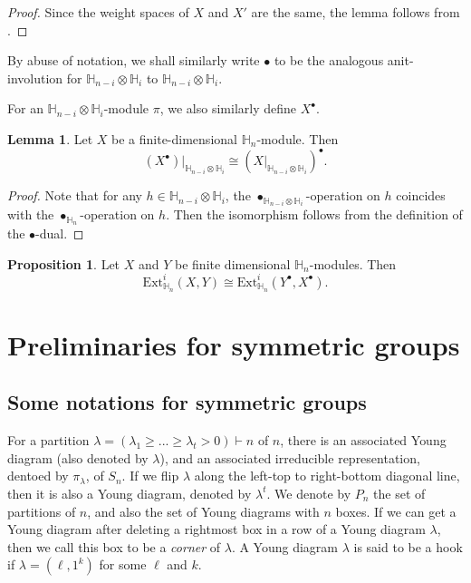 \documentclass[11pt]{amsart}
\numberwithin{equation}{section}
\theoremstyle{definition}
\newtheorem{lemma}[thm]{Lemma}
\newtheorem{proposition}[thm]{Proposition}
\begin{document}
\begin{proof}
Since the weight spaces of \(X\) and \(X'\) are the same, the lemma follows from \cite[Propsoiton 4.3.1]{barbasch2013hermitian}.
\end{proof}



By abuse of notation, we shall similarly write $\bullet$ to be the analogous anit-involution for $\mathbb H_{n-i}\otimes \mathbb H_i$ to $\mathbb H_{n-i}\otimes \mathbb H_i$. 

For an $\mathbb H_{n-i}\otimes \mathbb H_i$-module $\pi$, we also similarly define $X^{\bullet}$.

\begin{lemma} \label{lem dual of bullet}
Let $X$ be a finite-dimensional $\mathbb H_n$-module. Then 
\[   (X^{\bullet})|_{\mathbb H_{n-i}\otimes \mathbb H_i} \cong (X|_{\mathbb H_{n-i}\otimes \mathbb H_i})^{\bullet} .
\]

\end{lemma}

\begin{proof}
Note that for any $h \in \mathbb H_{n-i}\otimes \mathbb H_i$, the $\bullet_{\mathbb H_{n-i}\otimes \mathbb H_i}$-operation on $h$ coincides with the $\bullet_{\mathbb H_n}$-operation on $h$. Then the isomorphism follows from the definition of the $\bullet$-dual.
\end{proof}


\begin{proposition} \label{prop dual ext} \cite[Proposition 4.10]{chan2016duality}
Let $X$ and $Y$ be finite dimensional $\mathbb H_n$-modules. Then
\[   \mathrm{Ext}^i_{\mathbb H_n}(X, Y) \cong \mathrm{Ext}^i_{\mathbb H_n}(Y^{\bullet}, X^{\bullet}) .
\]
\end{proposition}


\section{Preliminaries for symmetric groups}\label{Sec preliminaries for sym gp}
\subsection{Some notations for symmetric groups}
For a partition $\lambda=(\lambda_{1}\geq...\geq\lambda_{t}>0)\vdash n$ of $n$, there is an associated Young diagram (also denoted by $\lambda$), and an associated irreducible representation, dentoed by $\pi_{\lambda}$, of $S_{n}$.  If we flip $\lambda$ along the left-top to right-bottom diagonal line, then it is also a Young diagram, denoted by $\lambda^{t}$. 
We denote by $P_{n}$ the set of partitions of $n$, and also the set of Young diagrams with $n$ boxes. If we can get a Young diagram after deleting a rightmost box in a row of a Young diagram $\lambda$, then we call this box to be a \emph{corner} of $\lambda$. A Young diagram $\lambda$ is said to be a hook if $\lambda=(\ell, 1^k)$ for some $\ell$ and $k$.
\end{document}
